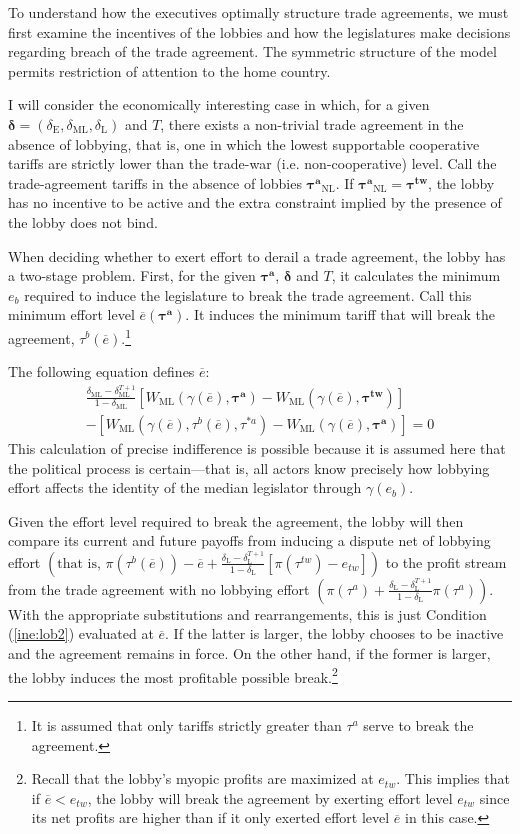 \documentclass[authoryear, review]{elsarticle}
\newcommand{\ov}{\overline}
\newcommand{\bta}{\bm{\tau^a}}
\newcommand{\ga}{\gamma}
\newcommand{\btw}{\bm{\tau^{tw}}}
\newcommand{\de}{\delta}
\begin{document}
To understand how the executives optimally structure trade agreements, we must first examine the incentives of the lobbies and how the legislatures make decisions regarding breach of the trade agreement. The symmetric structure of the model permits restriction of attention to the home country.

I will consider the economically interesting case in which, for a given $\bm{\de}=\left(\de_\text{E},\de_\text{ML},\de_\text{L}\right)$ and $T$, there exists a non-trivial trade agreement in the absence of lobbying, that is, one in which the lowest supportable cooperative tariffs are strictly lower than the trade-war (i.e. non-cooperative) level. Call the trade-agreement tariffs in the absence of lobbies $\bta_{\text{NL}}$. If $\bta_{\text{NL}} = \btw$, the lobby has no incentive to be active and the extra constraint implied by the presence of the lobby does not bind.

When deciding whether to exert effort to derail a trade agreement, the lobby has a two-stage problem. First, for the given $\bta$, $\bm{\de}$ and $T$, it calculates the minimum $e_b$ required to induce the legislature to break the trade agreement. Call this minimum effort level $\ov{e}(\bta)$. It induces the minimum tariff that will break the agreement, $\tau^b(\ov{e})$.\footnote{It is assumed that only tariffs strictly greater than $\tau^a$ serve to break the agreement.}

The following equation defines $\ov{e}$:
\begin{multline}
  \frac{\de_\text{ML} - \de_\text{ML}^{T+1}}{1-\de_\text{ML}} \left[W_\text{ML}(\ga(\ov{e}),\bta) - W_\text{ML}(\ga(\ov{e}),\btw) \right] \\
	- \left[ W_\text{ML}(\ga(\ov{e}),\tau^b(\ov{e}),\tau^{*a}) - W_\text{ML}(\ga(\ov{e}),\bta) \right] = 0
  \label{eq:leg2}
\end{multline}
This calculation of precise indifference is possible because it is assumed here that the political process is certain---that is, all actors know precisely how lobbying effort affects the identity of the median legislator through $\ga(e_b)$.

Given the effort level required to break the agreement, the lobby will then compare its current and future payoffs from inducing a dispute net of lobbying effort $\left(\text{that is, }\pi(\tau^b(\ov{e})) - \ov{e} + \frac{\de_\text{L} - \de_\text{L}^{T+1}}{1-\de_\text{L}} \left[\pi(\tau^{tw}) -e_{tw}\right] \right)$ to the profit stream from the trade agreement with no lobbying effort $\left(\pi(\tau^a) + \frac{\de_\text{L} - \de_\text{L}^{T+1}}{1-\de_\text{L}} \pi(\tau^a) \right)$. With the appropriate substitutions and rearrangements, this is just Condition (\ref{ine:lob2}) evaluated at $\ov{e}$. If the latter is larger, the lobby chooses to be inactive and the agreement remains in force. On the other hand, if the former is larger, the lobby induces the most profitable possible break.\footnote{Recall that the lobby's myopic profits are maximized at $e_{tw}$. This implies that if $\ov{e} < e_{tw}$, the lobby will break the agreement by exerting effort level $e_{tw}$ since its net profits are higher than if it only exerted effort level $\ov{e}$ in this case.} 
\end{document}
